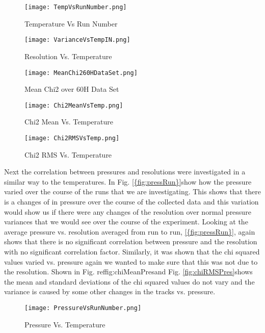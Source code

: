 \documentclass[./Thesis]{subfiles}
\begin{document}
\begin{figure}
	\centerline{\texttt{[image: TempVsRunNumber.png]}}
	\caption[Temperature Vs Run Number]{ Temperature Vs Run Number}
	\label{fig:TempRun}
\end{figure} 

\begin{figure}
	\centerline{\texttt{[image: VarianceVsTempIN.png]}}
	\caption[Resolution Vs. Temperature]{Resolution Vs. Temperature}
	\label{fig:ResRun}
\end{figure} 

\begin{figure}
	\centerline{\texttt{[image: MeanChi260HDataSet.png]}}
	\caption[Mean Chi2 over 60H Data Set]{ Mean Chi2 over 60H Data Set}
	\label{fig:ChiRun}
\end{figure} 

\begin{figure}
	\centerline{\texttt{[image: Chi2MeanVsTemp.png]}}
	\caption[Chi2 Mean Vs. Temperature]{Chi2 Mean Vs. Temperature}
	\label{fig:chiTemp}
\end{figure} 
	 
\begin{figure}
	\centerline{\texttt{[image: Chi2RMSVsTemp.png]}}
	\caption[Chi2 RMS Vs. Temperature]{Chi2 RMS Vs. Temperature}
	\label{fig:chiRMS}
\end{figure} 	
	
		 
	 Next the correlation between pressures and resolutions were investigated in a similar way to the temperatures. In Fig. \ref {{fig:pressRun}}show how the pressure varied over the course of the runs that we are investigating. This shows that there is a changes of in pressure over the course of the collected data and this variation would show us if there were any changes of the resolution over normal pressure variances that we would see over the course of the experiment. Looking at the average pressure vs. resolution averaged from run to run, \ref {{fig:pressRun}}, again shows that there is no significant correlation between pressure and the resolution with no significant correlation factor.  Similarly, it was shown that the chi squared values varied vs. pressure again we wanted to make sure that this was not due to the resolution. Shown in Fig. ref{fig:chiMeanPres}and Fig. \ref{fig:chiRMSPres}shows the mean and standard deviations of the chi squared values do not vary and the variance is caused by some other changes in the tracks vs. pressure.
 \begin{figure}
	\centerline{\texttt{[image: PressureVsRunNumber.png]}}
	\caption[Pressure Vs Run Number]{Pressure Vs. Temperature}
	\label{fig:pressRun}
\end{figure} 	
\end{document}
